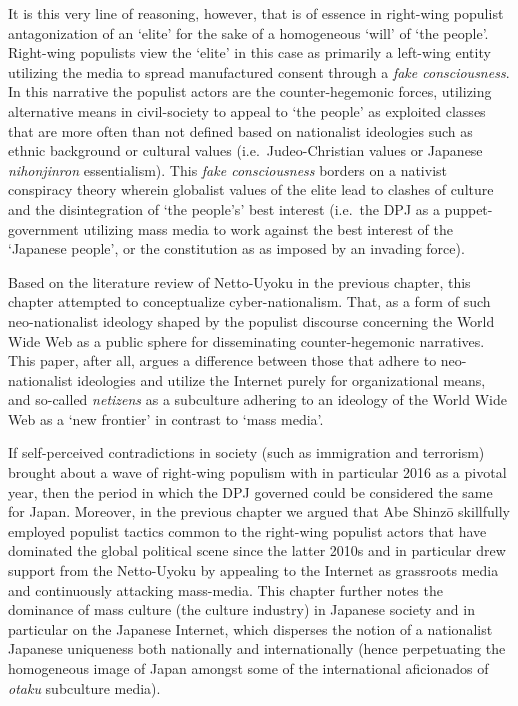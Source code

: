 \documentclass[10pt,british,A4paper,oneside]{memoir}
\begin{document}
It is this very line of reasoning, however, that is of essence in
right-wing populist antagonization of an `elite' for the sake of a
homogeneous `will' of `the people'. Right-wing populists view the
`elite' in this case as primarily a left-wing entity utilizing the media
to spread manufactured consent through a \emph{fake consciousness}. In
this narrative the populist actors are the counter-hegemonic forces,
utilizing alternative means in civil-society to appeal to `the people' as
exploited classes that are more often than not defined based on
nationalist ideologies such as ethnic background or cultural values
(i.e.~Judeo-Christian values or Japanese \emph{nihonjinron}
essentialism). This \emph{fake consciousness} borders on a nativist
conspiracy theory wherein globalist values of the elite lead to clashes
of culture and the disintegration of `the people's' best interest
(i.e.~the DPJ as a puppet-government utilizing mass media to work
against the best interest of the `Japanese people', or the constitution
as as imposed by an invading force).

Based on the literature review of Netto-Uyoku in the previous chapter,
this chapter attempted to conceptualize cyber-nationalism. That, as a
form of such neo-nationalist ideology shaped by the populist discourse
concerning the World Wide Web as a public sphere for disseminating
counter-hegemonic narratives. This paper, after all, argues a difference
between those that adhere to neo-nationalist ideologies and utilize the
Internet purely for organizational means, and so-called \emph{netizens}
as a subculture adhering to an ideology of the World Wide Web as a `new
frontier' in contrast to `mass media'.

If self-perceived contradictions in society (such as immigration and
terrorism) brought about a wave of right-wing populism with in
particular 2016 as a pivotal year, then the period in which the DPJ
governed could be considered the same for Japan. Moreover, in the
previous chapter we argued that Abe Shinzō skillfully employed populist
tactics common to the right-wing populist actors that have dominated the
global political scene since the latter 2010s and in particular drew
support from the Netto-Uyoku by appealing to the Internet as grassroots
media and continuously attacking mass-media. This chapter further notes
the dominance of mass culture (the culture industry) in Japanese society
and in particular on the Japanese Internet, which disperses the notion
of a nationalist Japanese uniqueness both nationally and internationally
(hence perpetuating the homogeneous image of Japan amongst some of the
international aficionados of \emph{otaku} subculture media).
\end{document}
